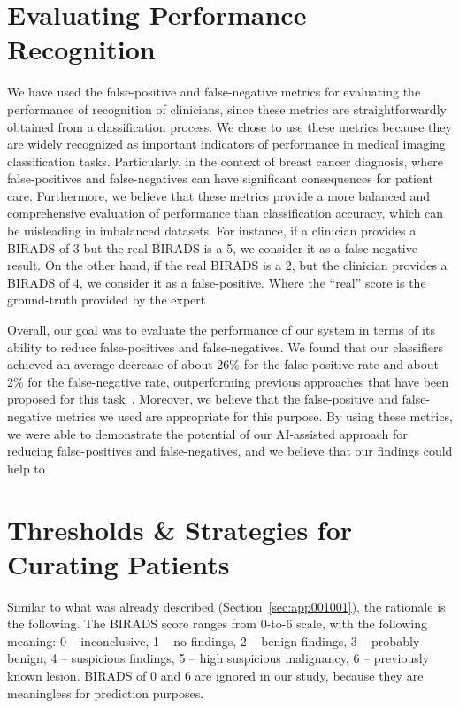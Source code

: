 \section{Evaluating Performance Recognition}
\label{sec:app001005}

We have used the false-positive and false-negative metrics for evaluating the performance of recognition of clinicians, since these metrics are straightforwardly obtained from a classification process.
We chose to use these metrics because they are widely recognized as important indicators of performance in medical imaging classification tasks.
Particularly, in the context of breast cancer diagnosis, where false-positives and false-negatives can have significant consequences for patient care.
Furthermore, we believe that these metrics provide a more balanced and comprehensive evaluation of performance than classification accuracy, which can be misleading in imbalanced datasets.
For instance, if a clinician provides a BIRADS of 3 but the real BIRADS is a 5, we consider it as a false-negative result.
On the other hand, if the real BIRADS is a 2, but the clinician provides a BIRADS of 4, we consider it as a false-positive.
Where the ``real'' score is the ground-truth provided by the expert %

Overall, our goal was to evaluate the performance of our system in terms of its ability to reduce false-positives and false-negatives.
We found that our classifiers achieved an average decrease of about 26\% for the false-positive rate and about 2\% for the false-negative rate, outperforming previous approaches that have been proposed for this task~\cite{CALISTO2022102285}.
Moreover, we believe that the false-positive and false-negative metrics we used are appropriate for this purpose.
By using these metrics, we were able to demonstrate the potential of our AI-assisted approach for reducing false-positives and false-negatives, and we believe that our findings could help to%

\section{Thresholds \& Strategies for Curating Patients}
\label{sec:app001006}

Similar to what was already described (Section~\ref{sec:app001001}), the rationale is the following.
The BIRADS score ranges from 0-to-6 scale, with the following meaning:
0 -- inconclusive,
1 -- no findings,
2 -- benign findings,
3 -- probably benign,
4 -- suspicious findings,
5 -- high suspicious malignancy,
6 -- previously known lesion.
BIRADS of 0 and 6 are ignored in our study, because they are meaningless for prediction purposes.

